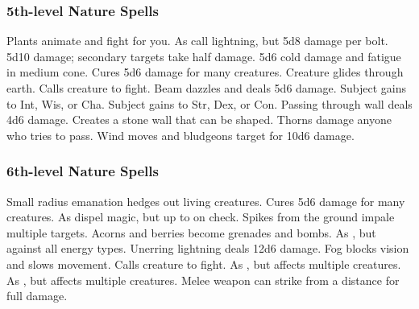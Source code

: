 \subsubsection{5th-level Nature Spells}
\begin{spelllist}
   Plants animate and fight for you.
   As call lightning, but 5d8 damage per bolt.
   5d10 damage; secondary targets take half damage.
   5d6 cold damage and fatigue in medium cone.
   Cures 5d6 damage for many creatures.
   Creature glides through earth. 
   Calls creature to fight.
   Beam dazzles and deals 5d6 damage.
   Subject gains  to Int, Wis, or Cha.
   Subject gains  to Str, Dex, or Con.
   Passing through wall deals 4d6 damage.
   Creates a stone wall that can be shaped.
   Thorns damage anyone who tries to pass.
   Wind moves and bludgeons target for 10d6 damage.
\end{spelllist}

\subsubsection{6th-level Nature Spells}
\begin{spelllist}
   Small radius emanation hedges out living creatures.
   Cures 5d6 damage for many creatures.
   As dispel magic, but up to  on check.
   Spikes from the ground impale multiple targets.
   Acorns and berries become grenades and bombs.
   As , but against all energy types.
   Unerring lightning deals 12d6 damage.
   Fog blocks vision and slows movement.
   Calls creature to fight.
   As , but affects multiple creatures.
   As , but affects multiple creatures.
   Melee weapon can strike from a distance for full damage.
\end{spelllist}

